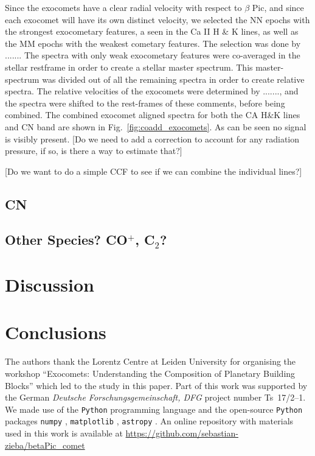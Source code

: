 \documentclass{aa}
\begin{document}
Since the exocomets have a clear radial velocity with respect to $\beta$ Pic, and since each exocomet will have its own distinct velocity, we selected the NN epochs with the strongest exocometary features, a seen in the Ca II H \& K lines, as well as the MM epochs with the weakest cometary features. The selection was done by .......
The spectra with only weak exocometary features were co-averaged in the stellar restframe in order to create a stellar master spectrum. This master-spectrum was divided out of all the remaining spectra in order to create relative spectra. 
The relative velocities of the exocomets were determined by ......., and the spectra were shifted to the rest-frames of these comments, before being combined. The combined exocomet aligned spectra for both the CA H\&K lines and CN band are shown in Fig.~\ref{fig:coadd_exocomets}. As can be seen no signal is visibly present. [Do we need to add a correction to account for any radiation pressure, if so, is there a way to estimate that?]

[Do we want to do a simple CCF to see if we can combine the individual lines?]


\subsection{CN}

\subsection{Other Species? CO$^+$, C$_2$?}

\section{Discussion}

\section{Conclusions}


\begin{acknowledgements}

      The authors thank the Lorentz Centre at Leiden University for organising the workshop ``Exocomets: Understanding the Composition of Planetary Building Blocks'' which led to the study in this paper. 
%
      Part of this work was supported by the German
      \emph{Deut\-sche For\-schungs\-ge\-mein\-schaft, DFG\/} project
      number Ts~17/2--1.
We made use of the {\tt Python} programming language \citep{rossum1995} and the open-source {\tt Python} packages {\tt numpy} \citep{walt2011}, {\tt matplotlib} \citep{hunter2007}, {\tt astropy} \citep{astropy2013}.
%      
An online repository with materials used in this work is available at \url{https://github.com/sebastian-zieba/betaPic_comet}
\end{acknowledgements}
\end{document}
